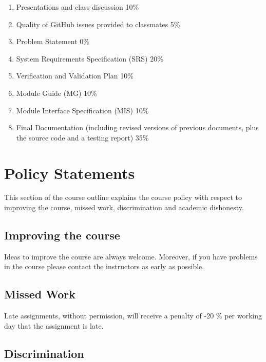 \documentclass[12pt]{article}
\begin{document}
\begin {enumerate}

\item Presentations and class discussion 10\%

\item Quality of GitHub issues provided to classmates 5\%

\item Problem Statement 0\%

\item System Requirements Specification (SRS) 20\%

\item Verification and Validation Plan 10\%

\item Module Guide (MG) 10\%

\item Module Interface Specification (MIS) 10\%

\item Final Documentation (including revised versions of previous documents,
  plus the source code and a testing report) 35\%

\end {enumerate}

\section {Policy Statements}

This section of the course outline explains the course policy with respect to
improving the course, missed work, discrimination and academic dishonesty.

\subsection {Improving the course}

Ideas to improve the course are always welcome.  Moreover, if you have problems
in the course please contact the instructors as early as possible.

\subsection {Missed Work}

Late assignments, without permission, will receive a penalty of -20 \% per
working day that the assignment is late.

\subsection {Discrimination}
\end{document}
